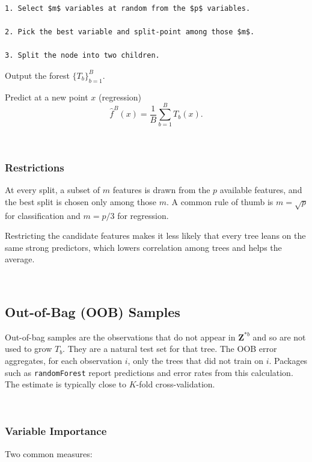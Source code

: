\documentclass[
]{book}
\begin{document}
\begin{verbatim}
1. Select $m$ variables at random from the $p$ variables.

2. Pick the best variable and split-point among those $m$.

3. Split the node into two children.
\end{verbatim}

Output the forest \(\{T_b\}_{b=1}^{B}\).

Predict at a new point \(x\) (regression)
\[ \hat{f}^B (x) = \frac{1}{B} \sum_{b=1}^{B} T_b(x).\]

~

\subsubsection*{Restrictions}\label{restrictions}

At every split, a subset of \(m\) features is drawn from the \(p\) available features, and the best split is chosen only among those \(m\). A common rule of thumb is \(m=\sqrt{p}\) for classification and \(m=p/3\) for regression.

Restricting the candidate features makes it less likely that every tree leans on the same strong predictors, which lowers correlation among trees and helps the average.

~

\subsection{Out-of-Bag (OOB) Samples}\label{out-of-bag-oob-samples}

Out-of-bag samples are the observations that do not appear in \(\mathbf{Z}^{*b}\) and so are not used to grow \(T_b\). They are a natural test set for that tree. The OOB error aggregates, for each observation \(i\), only the trees that did not train on \(i\). Packages such as \texttt{randomForest} report predictions and error rates from this calculation. The estimate is typically close to \(K\)-fold cross-validation.

~

\subsubsection{Variable Importance}\label{variable-importance}

Two common measures:
\end{document}
